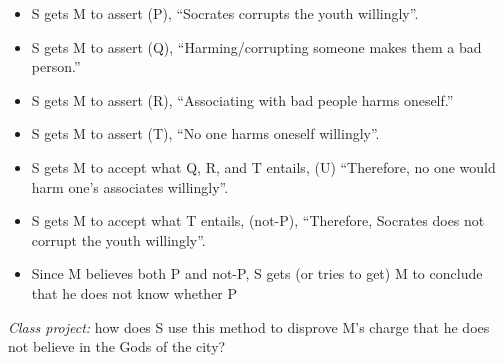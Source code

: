 \documentclass[oneside]{article}
\begin{document}
\begin{itemize}
\item{S gets M to assert (P), ``Socrates corrupts the youth willingly''.}
\item{ S gets M to assert (Q), ``Harming/corrupting someone makes them a bad person.''}
\item{S gets M to assert (R), ``Associating with bad people harms oneself.''}
\item{S gets M to assert (T), ``No one harms oneself willingly''.}
\item{S gets M to accept what Q,  R, and T entails, (U) ``Therefore, no one would harm one's associates willingly''.}
\item{S gets M to accept what T entails, (not-P), ``Therefore, Socrates does not corrupt the youth willingly''.}
\item{Since M believes both P and not-P, S gets (or tries to get) M to conclude that he does not know whether P}
\end{itemize}

\noindent \emph{Class project:} how does S use this method to disprove M's charge that he does not believe in the Gods of the city? 




\end{document}
